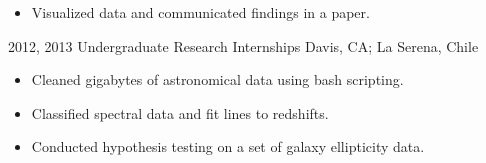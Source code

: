 \documentclass[]{cv-style}          %
\begin{document}
\begin{entrylist}
{\begin{itemize}
    \item Visualized data and communicated findings in a paper.\\
  \end{itemize}}
\entry
  {2012, 2013}
  {Undergraduate Research Internships}
  {Davis, CA; La Serena, Chile}
  {
  \begin{itemize}
    \item Cleaned gigabytes of astronomical data using bash scripting.
    \item Classified spectral data and fit lines to redshifts.
    \item Conducted hypothesis testing on a set of galaxy ellipticity data.\\
  \end{itemize}}


\end{entrylist}


\end{document}
